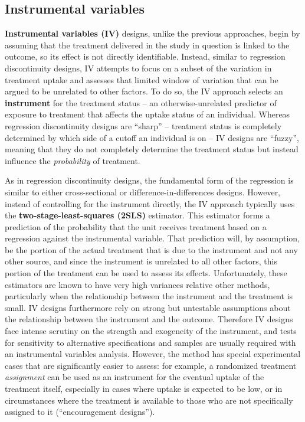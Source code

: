 \subsection{Instrumental variables}

\textbf{Instrumental variables (IV)} designs, unlike the previous approaches,
begin by assuming that the treatment delivered in the study in question is
linked to the outcome, so its effect is not directly identifiable.
Instead, similar to regression discontinuity designs,
IV attempts to focus on a subset of the variation in treatment uptake
and assesses that limited window of variation that can be argued
to be unrelated to other factors.\cite{angrist2001instrumental}
To do so, the IV approach selects an \textbf{instrument}
for the treatment status -- an otherwise-unrelated predictor of exposure to treatment
that affects the uptake status of an individual.
Whereas regression discontinuity designs are ``sharp'' --
treatment status is completely determined by which side of a cutoff an individual is on --
IV designs are ``fuzzy'', meaning that they do not completely determine
the treatment status but instead influence the \textit{probability} of treatment.

As in regression discontinuity designs,
the fundamental form of the regression
is similar to either cross-sectional or difference-in-differences designs.
However, instead of controlling for the instrument directly,
the IV approach typically uses the \textbf{two-stage-least-squares (2SLS)} estimator.
This estimator forms a prediction of the probability that the unit receives treatment
based on a regression against the instrumental variable.
That prediction will, by assumption, be the portion of the actual treatment
that is due to the instrument and not any other source,
and since the instrument is unrelated to all other factors,
this portion of the treatment can be used to assess its effects.
Unfortunately, these estimators are known
to have very high variances relative other methods,
particularly when the relationship between the instrument and the treatment is small.\cite{young2017consistency}
IV designs furthermore rely on strong but untestable assumptions
about the relationship between the instrument and the outcome.\cite{bound1995problems}
Therefore IV designs face intense scrutiny on the strength and exogeneity of the instrument,
and tests for sensitivity to alternative specifications and samples
are usually required with an instrumental variables analysis.
However, the method has special experimental cases that are significantly easier to assess:
for example, a randomized treatment \textit{assignment} can be used as an instrument
for the eventual uptake of the treatment itself,
especially in cases where uptake is expected to be low,
or in circumstances where the treatment is available
to those who are not specifically assigned to it (``encouragement designs'').

